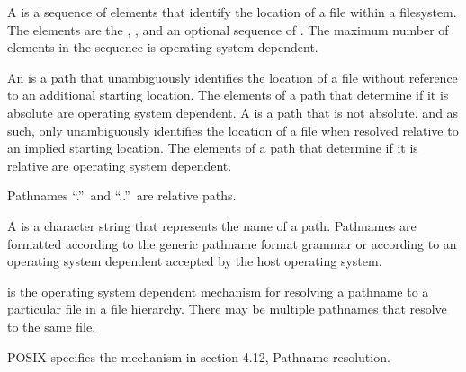 \pnum
A  is
a sequence of elements that identify
the location of a file within a filesystem.
The elements are the
,
,
and an optional sequence of .
The maximum number of elements in the sequence is
operating system dependent.

\pnum
An  is a path that unambiguously
identifies the location of a file without reference to an additional starting
location. The elements of a path that determine if it is absolute are
operating system dependent.
A  is
a path that is not absolute, and as such, only unambiguously
identifies the location of a file when resolved relative to
an implied starting location. The elements of a path that determine if it is
relative are operating system dependent.
\begin{note}
Pathnames ``.''\ and ``..''\ are relative paths.
\end{note}

\pnum
A  is
a character string that represents the name of a path. Pathnames are
formatted according to the generic pathname format grammar
or according to an
operating system dependent
 accepted by the host operating system.

\pnum
{}
is the operating system dependent mechanism for resolving
a pathname to a particular file in a file hierarchy. There may be multiple
pathnames that resolve to the same file.
\begin{example}
POSIX specifies the mechanism in section 4.12, Pathname resolution.
\end{example}

